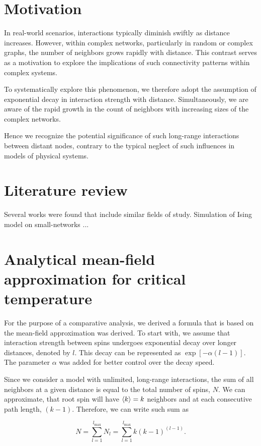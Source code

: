 \documentclass[11pt,a4paper]{article}
\begin{document}
\section{Motivation}

In real-world scenarios, interactions typically diminish swiftly as distance increases. However, within complex networks, particularly in random or complex graphs, the number of neighbors grows rapidly with distance. This contrast serves as a motivation to explore the implications of such connectivity patterns within complex systems.

To systematically explore this phenomenon, we therefore adopt the assumption of exponential decay in interaction strength with distance. Simultaneously, we are aware of the rapid growth in the count of neighbors with increasing sizes of the complex networks.

Hence we recognize the potential significance of such long-range interactions between distant nodes, contrary to the typical neglect of such influences in models of physical systems.


\section{Literature review}

Several works were found that include similar fields of study. 
Simulation of Ising model on small-networks ...


\section{Analytical mean-field approximation for critical temperature}

For the purpose of a comparative analysis, we derived a formula that is based on the mean-field approximation was derived. To start with, we assume that interaction strength between spins undergoes exponential decay over longer distances, denoted by $l$. This decay can be represented as $\exp[-\alpha (l-1)]$. The parameter $\alpha$ was added for better control over the decay speed.

Since we consider a model with unlimited, long-range interactions, the sum of all neighbors at a given distance is equal to the total number of spins, $N$. We can approximate, that root spin will have $\braket{k}=k$ neighbors and at each consecutive path length, $(k-1)$. Therefore, we can write such sum as

\begin{equation}\label{eqn:N_l}
    N = \sum_{l=1}^{l_{\max}} N_l = \sum_{l=1}^{l_{\max}} k (k-1)^{(l-1)}.
\end{equation}
\end{document}
